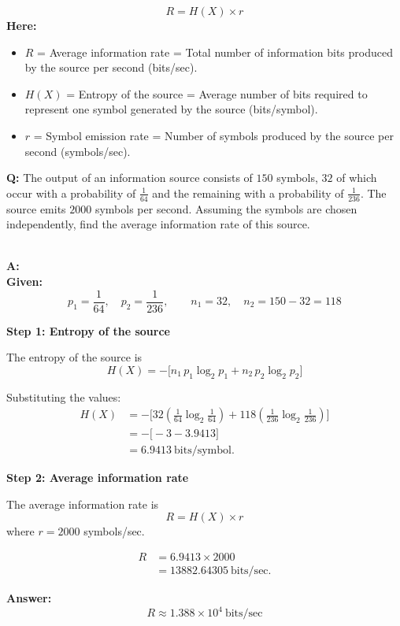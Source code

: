 \documentclass[11pt,a4paper]{book}
\newenvironment{formulabox}[1][Formula]{
    \begin{tcolorbox}[
        enhanced,
        breakable,
        colback=softcoral!10,
        colframe=softcoral!200,
        title=#1,
        fonttitle=\bfseries,
        coltitle=white,
        sharp corners,
        boxrule=1pt,
        left=8pt,
        right=8pt,
        top=6pt,
        bottom=6pt
    ]
}{
    \end{tcolorbox}
}
\newcounter{qna}[chapter]
\renewcommand{\theqna}{\thechapter.\arabic{qna}}
\newenvironment{questionanswerbox}{
    \refstepcounter{qna}%
    \begin{tcolorbox}[
        enhanced,
        breakable,
        colback=softlavender!10,
        colframe=softlavender!200,
        title={Example~\theqna}, %
        fonttitle=\bfseries,
        coltitle=white,
        colbacktitle=softlavender!200,
        sharp corners,
        boxrule=1pt,
        left=8pt,
        right=8pt,
        top=6pt,
        bottom=6pt
    ]
}{
    \end{tcolorbox}
}
\begin{document}
\begin{formulabox}[Average information rate]
    \[
R = H(X)\times r
\]
\textbf{Here:}
\begin{itemize}
    \item \(R\) = Average information rate = Total number of information bits produced by the source per second (bits/sec).
    \item \(H(X)\) = Entropy of the source = Average number of bits required to represent one symbol generated by the source (bits/symbol).
    \item \(r\) = Symbol emission rate = Number of symbols produced by the source per second (symbols/sec).
\end{itemize}

\end{formulabox}

\begin{questionanswerbox}
\textbf{Q:}
The output of an information source consists of \(150\) symbols, \(32\) of which
occur with a probability of \(\frac{1}{64}\) and the remaining with a probability
of \(\frac{1}{236}\).  
The source emits \(2000\) symbols per second.  
Assuming the symbols are chosen independently, find the average information
rate of this source.

\medskip\\
\textbf{A:}
\medskip\\
\textbf{Given:}
\[
p_1=\frac{1}{64}, \quad p_2=\frac{1}{236},
\qquad
n_1=32, \quad n_2=150-32=118
\]

\medskip

\textbf{Step 1: Entropy of the source}

The entropy of the source is
\[
H(X)
= -\Big[
n_1\,p_1\log_2 p_1 + n_2\,p_2\log_2 p_2
\Big]
\]

Substituting the values:
\begin{align*}
H(X)
&= -\Big[
32\left(\frac{1}{64}\log_2\frac{1}{64}\right)
+118\left(\frac{1}{236}\log_2\frac{1}{236}\right)
\Big] \\[6pt]
&= -\big[-3 - 3.9413\big] \\[6pt]
&= 6.9413 \ \text{bits/symbol}.
\end{align*}

\medskip

\textbf{Step 2: Average information rate}

The average information rate is
\[
R = H(X)\times r
\]
where \(r=2000\) symbols/sec.

\begin{align*}
R
&= 6.9413 \times 2000 \\[6pt]
&= 13882.64305 \ \text{bits/sec}.
\end{align*}

\medskip

\textbf{Answer:}
\[
\boxed{R \approx 1.388\times 10^{4}\ \text{bits/sec}}
\]
\end{questionanswerbox}
\end{document}

